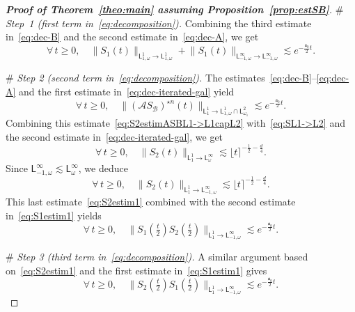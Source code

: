 \documentclass[11pt]{amsart}
\theoremstyle{definition}
\theoremstyle{remark}
\numberwithin{equation}{section}
\def\AA{{\mathcal A}}
\def\BB{{\mathcal B}}
\newcommand{\sfL}{\mathsf{L}}
\newcommand{\wangle}[1]{\lfloor #1 \rceil}
\begin{document}
\begin{proof}[{\bf Proof of Theorem~\ref{theo:main} assuming Proposition~\ref{prop:estSB}}]
  \smallskip\noindent
  {\# \sl Step~1 (first term in~\eqref{eq:decomposition}).} Combining the third estimate in~\eqref{eq:dec-B} and the second estimate in~\eqref{eq:dec-A}, we get
  \begin{equation}
    \label{eq:S1estim1}
    \forall \, t \ge 0, \quad \big\| S_1(t) \big\|_{\sfL^{1}_{1,\omega} \to \sfL^{1}_{1,\omega}} +
    \big\| S_1(t) \big\|_{\sfL^{\infty}_{-1,\omega}\to\sfL^{\infty}_{-1,\omega}} \lesssim e^{-\frac{\mathfrak{a}_0}{2}t}.
  \end{equation}
  
  \smallskip\noindent
  {\# \sl Step 2 (second term in~\eqref{eq:decomposition}).} The estimates~\eqref{eq:dec-B}--\eqref{eq:dec-A} and the first estimate in~\eqref{eq:dec-iterated-gal} yield
  \begin{equation}
    \label{eq:S2estimASBL1->L1capL2}
    \forall \, t \ge 0, \quad \big\| (\AA S_\BB)^{\star n} (t) \big\|_{\sfL^{1}_{1} \to \sfL^{1}_{1,\omega} \cap \sfL^{2}_{\omega_1}} \lesssim e^{-\frac{\mathfrak{a}_0}{2}t}.
  \end{equation}
  Combining this estimate~\eqref{eq:S2estimASBL1->L1capL2} with~\eqref{eq:SL1->L2} and the second  estimate in~\eqref{eq:dec-iterated-gal}, we get
  \begin{equation*}
    \forall \, t \ge 0, \quad \big\| S_2 (t) \big\|_{\sfL^{1}_{1} \to  \sfL^{\infty}_{\omega}} \lesssim \wangle{t}^{-\frac12-\frac{d}4}.
  \end{equation*}
  Since $\sfL^{\infty}_{-1,\omega} \lesssim \sfL^{\infty}_{\omega}$, we deduce
  \begin{equation}
    \label{eq:S2estim1}
    \forall \, t \ge 0, \quad \big\| S_2 (t) \big\|_{\sfL^{1}_{1} \to  \sfL^{\infty}_{-1,\omega}} \lesssim \wangle{t}^{-\frac12-\frac{d}4}.
  \end{equation}
  This last estimate~\eqref{eq:S2estim1} combined with the second estimate in~\eqref{eq:S1estim1} yields
  \begin{equation*}
    \forall \, t \ge 0, \quad \big\| S_1\left(\tfrac{t}{2}\right) S_2\left(\tfrac{t}{2}\right)\big\|_{\sfL^{1}_{1} \to  \sfL^{\infty}_{-1,\omega}} \lesssim e^{-\frac{\mathfrak{a}_0}{2}t}.
  \end{equation*}
  
  \smallskip\noindent
  {\# \sl Step 3 (third term in~\eqref{eq:decomposition}).}
  A similar argument based on~\eqref{eq:S2estim1} and the first estimate in~\eqref{eq:S1estim1} gives
  \begin{equation*}
    \forall \, t \ge 0, \quad \big\| S_2\left(\tfrac{t}{2}\right) S_1\left(\tfrac{t}{2}\right) \big\|_{\sfL^{1}_{1}  \to \sfL^{\infty}_{-1,\omega}} \lesssim e^{-\frac{\mathfrak{a}_0}{2}t}.
  \end{equation*}
  

\end{proof}
\end{document}
